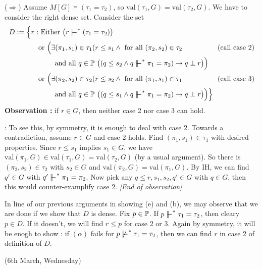 \documentclass[12pt,a4paper]{article}
\newenvironment{proof}
{\begin{changemargin}{0.5cm}{0.5cm} 
	}%
	{\end{changemargin}
}
\newenvironment{subproof}
{\begin{changemargin}{0.5cm}{0.5cm} 
	}%
	{\end{changemargin}
}
\newenvironment{p}
{\begin{proof} 
	}%
	{\end{proof}
}
\begin{document}
\begin{p}
\begin{itemize}
($\Rightarrow$) Assume $M[G] \models (\tau_1 = \tau_2)$, so $\text{val}(\tau_1, G) = \text{val}(\tau_2, G)$. We have to consider the right dense set. Consider the set
\begin{align*}
D:= \Big\{r: & \text{ Either } \big(r\forces^* (\tau_1 = \tau_2) \big) \\
& \text{or } \Big(\exists (\pi_1, s_1) \in \tau_1 (r\leq s_1 \wedge \text{ for all } (\pi_2, s_2) \in \tau_2 \quad\quad\quad\quad\quad \text{(call case 2)}\\
& \quad \quad \text{ and all } q \in \poset \,\, \big( (q\leq s_2 \wedge q\forces^* \pi_1= \pi_2) \rightarrow q\perp r \big) \Big) \\
& \text{or } \Big( \exists (\pi_2, s_2)\in \tau_2 (r\leq s_2 \wedge \text{ for all }(\pi_1, s_1)\in \tau_1 \quad\quad\quad\quad\quad \text{(call case 3)}\\
& \quad \quad \text{ and all } q \in \poset \,\, \big( (q\leq s_1 \wedge q\forces^* \pi_1 = \pi_2) \rightarrow q\perp r \big) \Big) \Big\}
\end{align*}
\textbf{Observation :} if $r\in G$, then neither case 2 nor case 3 can hold.
\begin{subproof}
: To see this, by symmetry, it is enough to deal with case 2. Towards a contradiction, assume $r \in G$ and case 2 holds. Find $(\pi_1, s_1) \in \tau_1$ with desired properties. Since $r\leq s_1$ implies $s_1\in G$, we have $\text{val}(\pi_1, G) \in \text{val}(\tau_1, G) = \text{val}(\tau_2, G)$ (by a usual argument). So there is $(\pi_2, s_2) \in \tau_2$ with $s_2 \in G$ and $\text{val}(\pi_2, G) = \text{val}(\pi_1, G)$. By IH, we can find $q' \in G$ with $q' \forces^* \pi_1 = \pi_2$. Now pick any $q\leq r, s_1, s_2, q'\in G$ with $q\in G$, then this would counter-examplify case 2. \emph{[End of observation]}.
\end{subproof}
In line of our previous arguments in showing (e) and (b), we may observe that we are done if we show that $D$ is dense. Fix $p\in \mathbb{P}$. If $p\forces^* \tau_1 = \tau_2$, then cleary $p\in D$. If it doesn't, we will find $r\leq p$ for case 2 or 3. Again by symmetry, it will be enogh to show : if $(\alpha)$ fails for $p\not\forces^* \tau_1 = \tau_2$, then we can find $r$ in case 2 of definition of $D$.
\end{itemize}
\end{p}
\s

\newday

(6th March, Wednesday)
\s
\end{document}
